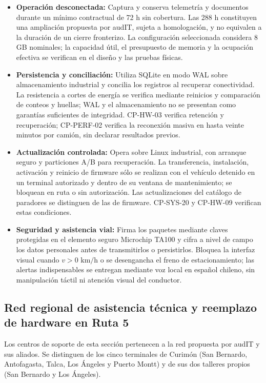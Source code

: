 \begin{itemize}
  \item \textbf{Operación desconectada:} Captura y conserva telemetría y documentos durante un mínimo contractual de 72 h sin cobertura. Las 288 h constituyen una ampliación propuesta por audIT, sujeta a homologación, y no equivalen a la duración de un cierre fronterizo. La configuración seleccionada considera 8 GB nominales; la capacidad útil, el presupuesto de memoria y la ocupación efectiva se verifican en el diseño y las pruebas físicas.
  \item \textbf{Persistencia y conciliación:} Utiliza SQLite en modo WAL sobre almacenamiento industrial y concilia los registros al recuperar conectividad. La resistencia a cortes de energía se verifica mediante reinicios y comparación de conteos y huellas; WAL y el almacenamiento no se presentan como garantías suficientes de integridad. CP-HW-03 verifica retención y recuperación; CP-PERF-02 verifica la reconexión masiva en hasta veinte minutos por camión, sin declarar resultados previos.
  \item \textbf{Actualización controlada:} Opera sobre Linux industrial, con arranque seguro y particiones A/B para recuperación. La transferencia, instalación, activación y reinicio de firmware sólo se realizan con el vehículo detenido en un terminal autorizado y dentro de su ventana de mantenimiento; se bloquean en ruta o sin autorización. Las actualizaciones del catálogo de paradores se distinguen de las de firmware. CP-SYS-20 y CP-HW-09 verifican estas condiciones.
  \item \textbf{Seguridad y asistencia vial:} Firma los paquetes mediante claves protegidas en el elemento seguro Microchip TA100 y cifra a nivel de campo los datos personales antes de transmitirlos o persistirlos. Bloquea la interfaz visual cuando $v > 0\text{ km/h}$ o se desengancha el freno de estacionamiento; las alertas indispensables se entregan mediante voz local en español chileno, sin manipulación táctil ni atención visual del conductor.
\end{itemize}

\subsection{Red regional de asistencia técnica y reemplazo de hardware en Ruta 5}\label{sec:1-red-regional}

Los centros de soporte de esta sección pertenecen a la red propuesta por audIT y sus aliados. Se distinguen de los cinco terminales de Curimón (San Bernardo, Antofagasta, Talca, Los Ángeles y Puerto Montt) y de sus dos talleres propios (San Bernardo y Los Ángeles).


